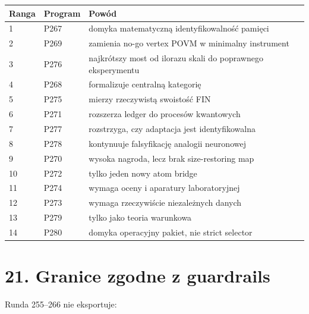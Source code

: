 \documentclass[11pt,a4paper,openany]{report}
\begin{document}
\begin{center}
\begingroup\small
\setlength{\tabcolsep}{2.5pt}
\renewcommand{\arraystretch}{1.16}
\begin{longtable}{@{}p{}p{}p{}@{}}
\toprule
\textbf{Ranga} & \textbf{Program} & \textbf{Powód} \\
\midrule
\endhead
1 & P267 & domyka matematyczną identyfikowalność pamięci \\
2 & P269 & zamienia no-go vertex POVM w minimalny instrument \\
3 & P276 & najkrótszy most od ilorazu skali do poprawnego eksperymentu \\
4 & P268 & formalizuje centralną kategorię \\
5 & P275 & mierzy rzeczywistą swoistość FIN \\
6 & P271 & rozszerza ledger do procesów kwantowych \\
7 & P277 & rozstrzyga, czy adaptacja jest identyfikowalna \\
8 & P278 & kontynuuje falsyfikację analogii neuronowej \\
9 & P270 & wysoka nagroda, lecz brak size-restoring map \\
10 & P272 & tylko jeden nowy atom bridge \\
11 & P274 & wymaga oceny i aparatury laboratoryjnej \\
12 & P273 & wymaga rzeczywiście niezale\.znych danych \\
13 & P279 & tylko jako teoria warunkowa \\
14 & P280 & domyka operacyjny pakiet, nie strict selector \\
\bottomrule
\end{longtable}
\endgroup
\end{center}

\chapter{21. Granice zgodne z guardrails}

Runda 255--266 nie eksportuje:
\end{document}
